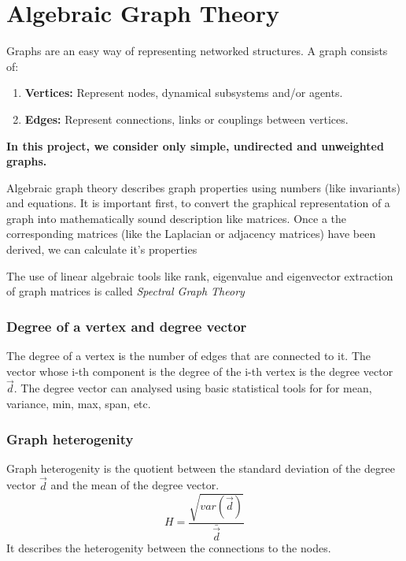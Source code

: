 \documentclass[a4paper,twoside, openright,12pt]{report}
\begin{document}

\section{Algebraic Graph Theory}

Graphs are an easy way of representing networked structures. A graph consists of: 
\begin{enumerate}
\item \textbf{Vertices:} Represent nodes, dynamical subsystems and/or agents.
\item \textbf{Edges:} Represent connections, links or couplings between vertices.
\end{enumerate}

\textbf{In this project, we consider only simple, undirected and unweighted graphs.} \linebreak

Algebraic graph theory describes graph properties using numbers (like invariants) and equations.
It is important first, to convert the graphical representation of a graph into mathematically sound description like
matrices. Once a the corresponding matrices (like the Laplacian or adjacency matrices) have been derived, we can calculate it's properties \cite{godsil2001algebraic} 

The use of linear algebraic tools like rank, eigenvalue and eigenvector extraction of graph matrices is called \textit{Spectral Graph Theory} 

\subsubsection{Degree of a vertex and degree vector}
The degree of a vertex is the number of edges that are connected to it.
The vector whose i-th component is the degree of the i-th vertex is the degree vector $\vec{d}$. 
The degree vector can analysed using basic statistical tools for for mean, variance, min, max, span, etc.

\subsubsection{Graph heterogenity}
Graph heterogenity is the quotient between the standard deviation of the degree vector $\vec{d}$ and the mean of the degree vector.
\begin{equation}
 H = \frac{\sqrt{ var(\vec{d}) }}{\bar{\vec{d}}} 
\end{equation}
It describes the heterogenity between the connections to the nodes.   
\end{document}
